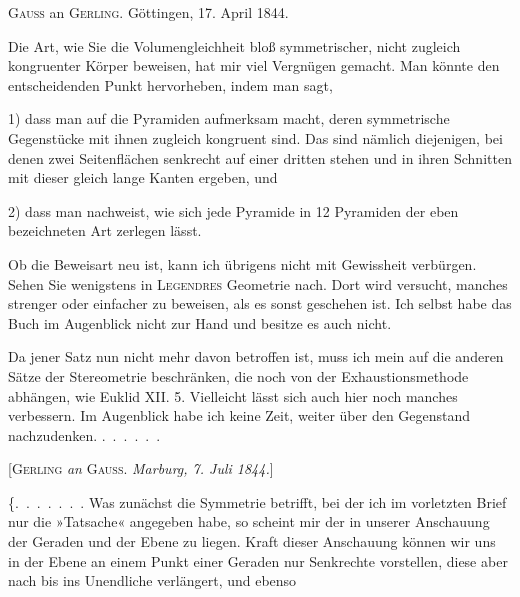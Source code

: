 %
\begin{center}
\textsc{Gauss} an \textsc{Gerling.} Göttingen, 17. April 1844.
\end{center}

Die Art, wie Sie die Volumengleichheit bloß symmetrischer, nicht zugleich kongruenter Körper beweisen, hat mir viel Vergnügen gemacht. Man könnte den entscheidenden Punkt hervorheben, indem man sagt,

1) dass man auf die Pyramiden aufmerksam macht, deren symmetrische Gegenstücke mit ihnen zugleich kongruent sind. Das sind nämlich diejenigen, bei denen zwei Seitenflächen senkrecht auf einer dritten stehen und in ihren Schnitten mit dieser gleich lange Kanten ergeben, und

2) dass man nachweist, wie sich jede Pyramide in 12 Pyramiden der eben bezeichneten Art zerlegen lässt.

Ob die Beweisart neu ist, kann ich übrigens nicht mit Gewissheit verbürgen. Sehen Sie wenigstens in \textsc{Legendres} Geometrie nach. Dort wird versucht, manches strenger oder einfacher zu beweisen, als es sonst geschehen ist. Ich selbst habe das Buch im Augenblick nicht zur Hand und besitze es auch nicht.

Da jener Satz nun nicht mehr davon betroffen ist, muss ich mein  auf die anderen Sätze der Stereometrie beschränken, die noch von der Exhaustionsmethode abhängen, wie Euklid XII. 5. Vielleicht lässt sich auch hier noch manches verbessern. Im Augenblick habe ich keine Zeit, weiter über den Gegenstand nachzudenken. \mbox{.\ .\ .\ .\ .\ .}

\begin{center}
[\textsc{Gerling} \emph{an} \textsc{Gauss}. \emph{Marburg, 7. Juli 1844.}]
\end{center}

\{\mbox{.\ .\ .\ .\ .\ .\ .} Was zunächst die Symmetrie betrifft, bei der ich im vorletzten Brief nur die »Tatsache« angegeben habe, so scheint mir der  in unserer Anschauung der Geraden und der Ebene zu liegen. Kraft dieser Anschauung können wir uns in der Ebene an einem Punkt einer Geraden nur  Senkrechte vorstellen, diese aber nach  bis ins Unendliche verlängert, und ebenso\space%
